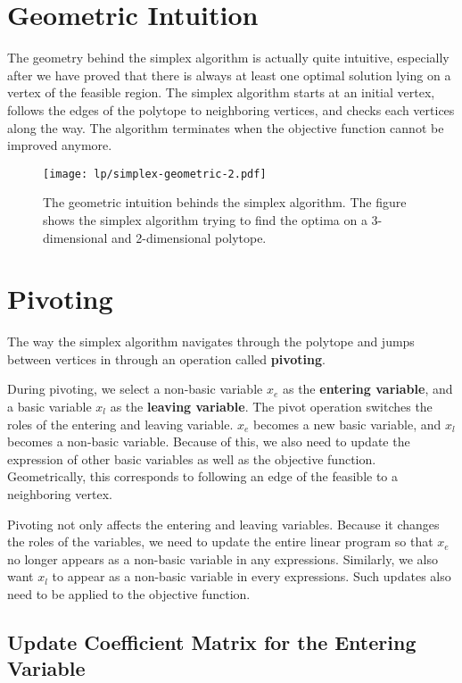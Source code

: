 \section{Geometric Intuition}

The geometry behind the simplex algorithm is actually quite intuitive, especially after we have proved that there is always at least one optimal solution lying on a vertex of the feasible region. The simplex algorithm starts at an initial vertex, follows the edges of the polytope to neighboring vertices, and checks each vertices along the way. The algorithm terminates when the objective function cannot be improved anymore.

\begin{figure}[htbp]
    \centering
    \texttt{[image: lp/simplex-geometric-2.pdf]}
    \caption{The geometric intuition behinds the simplex algorithm. The figure shows the simplex algorithm trying to find the optima on a 3-dimensional and 2-dimensional polytope.}
    \label{fig:simplex-geometric}
\end{figure}

\section{Pivoting}

The way the simplex algorithm navigates through the polytope and jumps between vertices in through an operation called \textbf{pivoting}.

During pivoting, we select a non-basic variable $x_e$ as the \textbf{entering variable}, and a basic variable $x_l$ as the \textbf{leaving variable}. The pivot operation switches the roles of the entering and leaving variable. $x_e$ becomes a new basic variable, and $x_l$ becomes a non-basic variable. Because of this, we also need to update the expression of other basic variables as well as the objective function. Geometrically, this corresponds to following an edge of the feasible to a neighboring vertex.

Pivoting not only affects the entering and leaving variables. Because it changes the roles of the variables, we need to update the entire linear program so that $x_e$ no longer appears as a non-basic variable in any expressions. Similarly, we also want $x_l$ to appear as a non-basic variable in every expressions. Such updates also need to be applied to the objective function.

\subsection{Update Coefficient Matrix for the Entering Variable}

